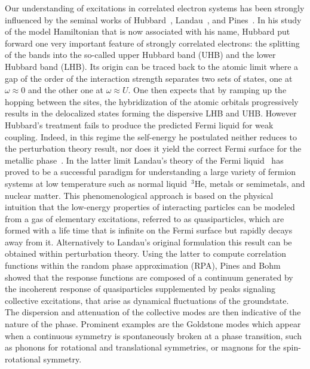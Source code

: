 \documentclass[showpacs,amsmath,twocolumn,floatfix]{revtex4-1}
\begin{document}
Our understanding of excitations in correlated electron systems has been
strongly influenced by the seminal works of Hubbard~\cite{Hub63}, 
Landau~\cite{Lan56}, and Pines~\cite{PinBoh}. In his study~\cite{Hub63} of the 
model Hamiltonian that is now associated with his name, Hubbard put forward one 
very important feature of strongly correlated electrons: the splitting of the 
bands into the so-called upper Hubbard band (UHB) and the lower Hubbard band 
(LHB). Its origin can be traced back to the atomic limit where a gap of the 
order of the interaction strength separates two sets of states, one at 
$\omega\approx 0$ and the other one at $\omega \approx U$. One then expects that by 
ramping up the hopping between the sites, the hybridization of the atomic orbitals 
progressively results in the delocalized states forming the dispersive LHB and 
UHB. However Hubbard's treatment fails to produce the predicted 
Fermi liquid for weak coupling. Indeed, in this regime the self-energy he postulated 
neither reduces to the perturbation theory result, nor does it yield the correct Fermi 
surface for the metallic phase~\cite{Edw68}. In the latter limit Landau's theory of the 
Fermi liquid~\cite{Lan56,PinNoz,Vol84} has proved to be a successful paradigm for 
understanding a large variety of fermion systems at low temperature such as normal 
liquid $\,^3$He, metals or semimetals, and nuclear matter. This phenomenological 
approach is based on the physical intuition that the low-energy properties of 
interacting particles can be modeled from a gas of elementary excitations, 
referred to as quasiparticles, which are formed with a life time that is infinite 
on the Fermi surface but rapidly decays away from it. Alternatively to Landau's 
original formulation this result can be obtained within perturbation theory. 
Using the latter to compute correlation functions within the random phase
approximation (RPA), Pines and Bohm~\cite{PinBoh} showed that the response 
functions are composed of a continuum generated by the incoherent response of
quasiparticles supplemented by peaks signaling collective excitations, that
arise as dynamical fluctuations of the groundstate. The dispersion and 
attenuation of the collective modes are then indicative of the nature of the 
phase. Prominent examples are the Goldstone modes which appear when a continuous 
symmetry is spontaneously broken at a phase transition, such as phonons for 
rotational and translational symmetries, or magnons for the spin-rotational 
symmetry.
\end{document}
